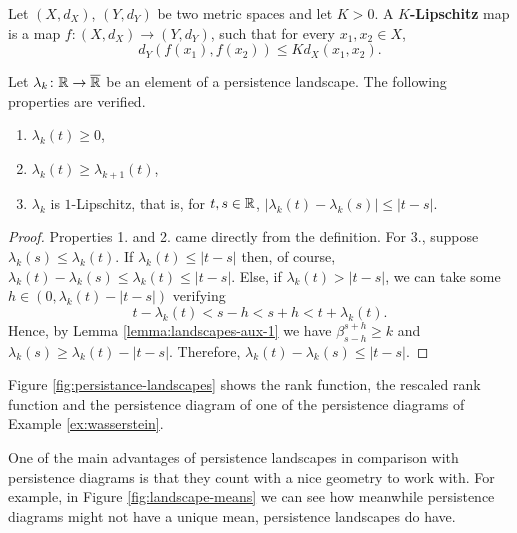 \begin{definition}[$K$-Lipschitz]
    Let $ (X, d_X) $, $ (Y, d_Y) $ be two metric spaces and let $ K > 0 $. A {\bf $K$-Lipschitz} map is a map $ f \colon (X, d_X) \to (Y, d_Y) $, such that for every $ x_1, x_2 \in X $, 
    \begin{equation}
        d_Y(f(x_1), f(x_2)) \leq K d_X(x_1, x_2).
    \end{equation}
\end{definition}

\begin{lemma} \label{lemma:landscapes-aux-3}
    Let $ \lambda_k \colon \mathbb R \to \overline{\mathbb R} $ be an element of a persistence landscape. The following properties are verified.
    \begin{enumerate}
        \item $\lambda_k(t) \geq 0$,
        \item $\lambda_k(t) \geq \lambda_{k+1}(t)$,
        \item $\lambda_k$ is $1$-Lipschitz, that is, for $ t, s \in \mathbb R $, $ | \lambda_k(t) - \lambda_k(s) | \leq |t-s| $.
    \end{enumerate}
\end{lemma}
\begin{proof}
    Properties 1. and 2. came directly from the definition. For 3., suppose $ \lambda_k(s) \leq \lambda_k(t) $. If $ \lambda_k(t) \leq |t -s | $ then, of course, $ \lambda_k(t) - \lambda_k(s) \leq \lambda_k(t) \leq |t-s| $. Else, if $ \lambda_k(t) >  |t - s | $, we can take some $ h \in (0, \lambda_k(t) -  |t - s |) $ verifying
    \begin{equation}
        t - \lambda_k(t) < s- h < s + h < t + \lambda_k(t).
    \end{equation}
    Hence, by Lemma \ref{lemma:landscapes-aux-1} we have $ \beta_{s-h}^{s+h} \geq k $ and $ \lambda_k(s) \geq \lambda_k(t) - |t -s| $. Therefore, $ \lambda_k(t) - \lambda_k(s) \leq |t-s| $.
\end{proof}

\begin{example}
    Figure \ref{fig:persistance-landscapes} shows the rank function, the rescaled rank function and the persistence diagram of one of the persistence diagrams of Example \ref{ex:wasserstein}.
    
\end{example}

\begin{example}
    One of the main advantages of persistence landscapes in comparison with persistence diagrams is that they count with a nice geometry to work with. For example, in Figure \ref{fig:landscape-means} we can see how meanwhile persistence diagrams might not have a unique mean, persistence landscapes do have.
    \begin{figure}[H]
        
    \end{figure}
\end{example}

